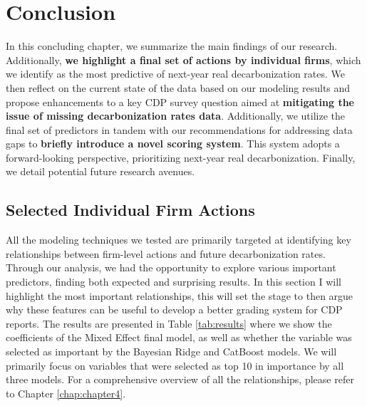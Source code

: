 \chapter{Conclusion}
\label{chap:conclusion}

\begin{keytakeaway}
In this concluding chapter, we summarize the main findings of our research. Additionally, \textbf{we highlight a final set of actions by individual firms}, which we identify as the most predictive of next-year real decarbonization rates. We then reflect on the current state of the data based on our modeling results and propose enhancements to a key CDP survey question aimed at \textbf{mitigating the issue of missing decarbonization rates data}. Additionally, we utilize the final set of predictors in tandem with our recommendations for addressing data gaps to \textbf{briefly introduce a novel scoring system}. This system adopts a forward-looking perspective, prioritizing next-year real decarbonization. Finally, we detail potential future research avenues.
\end{keytakeaway}

\section{Selected Individual Firm Actions}
All the modeling techniques we tested are primarily targeted at identifying key relationships between firm-level actions and future decarbonization rates. Through our analysis, we had the opportunity to explore various important predictors, finding both expected and surprising results. In this section I will highlight the most important relationships, this will set the stage to then argue why these features can be useful to develop a better grading system for CDP reports. The results are presented in Table \ref{tab:results} where we show the coefficients of the Mixed Effect final model, as well as whether the variable was selected as important by the Bayesian Ridge and CatBoost models. We will primarily focus on variables that were selected as top 10 in importance by all three models. For a comprehensive overview of all the relationships, please refer to Chapter \ref{chap:chapter4}.



